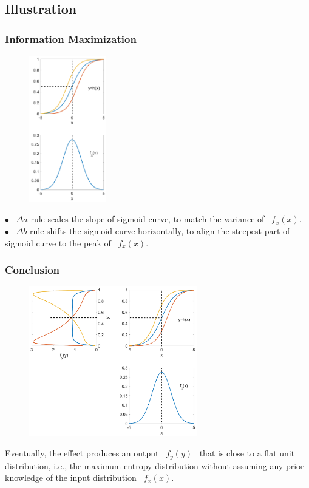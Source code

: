 \documentclass[10pt, mathserif]{beamer}	%
\newcommand{\ftitle}[1]{\frametitle{\hspace{4ex} {#1}}}	%
\begin{document}
\begin{CJK}{UTF8}{song}
\section{Illustration}
\begin{frame}
	\ftitle{Information Maximization}
	\begin{minipage}{\textwidth}
	\begin{figure}
		\centering
		\includegraphics[width=0.3\textwidth]{example1.pdf}
		\label{fig:example}
	\end{figure}	
	\end{minipage}
	$\bullet$ \ $\Delta a$ rule scales the slope of sigmoid curve, to match the variance of \ $f_x(x)$. \\
	$\bullet$ \ $\Delta b$ rule shifts the sigmoid curve horizontally, to align the steepest part of sigmoid curve to the peak of \ $f_x(x)$. \\	
\end{frame}

\begin{frame}
	\ftitle{Conclusion}
	\begin{minipage}{\textwidth}
		\begin{figure}
			\centering
			\includegraphics[width=0.65\textwidth]{example2.pdf}
		\end{figure}	
	\end{minipage}
	Eventually, the effect {\color{red}produces an output ~$f_y(y)$~ }that is {\color{red}close to a flat unit distribution}, i.e., the {\color{red}maximum entropy distribution} without assuming any prior knowledge of the input distribution ~$f_x(x)$.
\end{frame}


\end{CJK}
\end{document}
